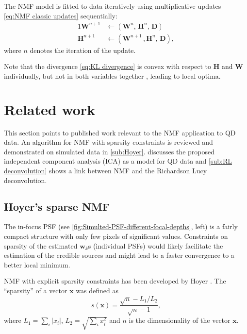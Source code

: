 The NMF model is fitted to data iteratively using multiplicative updates \autoref{eq:NMF classic updates} sequentially: 
%	
\begin{alignat}{1}
	\bm{W}^{n+1} & \longleftarrow \left(\bm{W}^n,\, \bm{H}^n,\, \bm{D}\right)\\
	\bm{H}^{n+1} & \longleftarrow \left(\bm{W}^{n+1}\,, \bm{H}^n,\, \bm{D}\right),
\end{alignat}
%
where $n$ denotes the iteration of the update.

Note that the divergence \autoref{eq:KL divergence} is convex with respect to $\bm{H}$ and $\bm{W}$ individually, but not in both variables together \cite{Lee2001}, leading to local optima.


\clearpage
\section{Related work \label{sec:NMF related}}
This section points to published work relevant to the NMF application to QD data. An algorithm for NMF with sparsity constraints is reviewed and demonstrated on simulated data in \autoref{sub:Hoyer}.  discusses the proposed independent component analysis (ICA) as a model for QD data and \autoref{sub:RL deconvolution} shows a link between NMF and the Richardson \textendash{} Lucy deconvolution.

\subsection{Hoyer's sparse NMF \label{sub:Hoyer}}
The in-focus PSF (see \autoref{fig:Simulted-PSF-different-focal-depths}, left) is a fairly compact structure with only few pixels of significant values. Constraints on sparsity of the estimated $\bm{w}_k$s (individual PSFs) would likely facilitate the estimation of the credible sources and might lead to a faster convergence to a better local minimum. 


NMF with explicit sparsity constraints has been developed by Hoyer \cite{Hoyer2004}. The ``sparsity'' of a vector $\bm{x}$ was defined as 
%
\begin{equation}
	s(\bm{x})=\frac{\sqrt{n}-L_1/L_2}{\sqrt{n}-1},
	\label{eq:Hoyers sparsity}
\end{equation}
%
where $L_1=\sum_i|x_i|$, $L_2=\sqrt{\sum_i x^2_i}$ and $n$ is the dimensionality of the vector $\bm{x}$.

